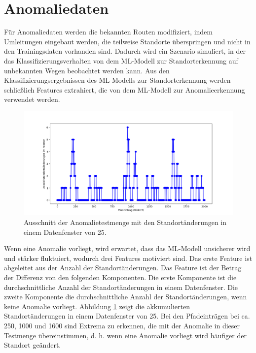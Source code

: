 \section{Anomaliedaten}
\label{sec:data_anomalie}
Für Anomaliedaten werden die bekannten Routen modifiziert, indem Umleitungen eingebaut werden, die teilweise Standorte überspringen
und nicht in den Trainingsdaten vorhanden sind.
Dadurch wird ein Szenario simuliert, in der das Klassifizierungsverhalten von dem ML-Modell zur Standorterkennung auf unbekannten Wegen beobachtet werden kann.
Aus den Klassifizierungsergebnissen des ML-Modells zur Standorterkennung werden schließlich Features extrahiert,
die von dem ML-Modell zur Anomalieerkennung verwendet werden.
\begin{figure}[h!]
    \centering
    \includegraphics[width=\linewidth]{images/feature_window_location_changes.png}
    \caption{Ausschnitt der Anomalietestmenge mit den Standortänderungen in einem Datenfenster von 25.}
    \label{fig:window_location_changes}
\end{figure}
\newline
\newline
Wenn eine Anomalie vorliegt, wird erwartet, dass das ML-Modell unsicherer wird und stärker fluktuiert,
wodurch drei Features motiviert sind.
Das erste Feature ist abgeleitet aus der Anzahl der Standortänderungen.
Das Feature ist der Betrag der Differenz von den folgenden Komponenten.
Die erste Komponente ist die durchschnittliche Anzahl der Standortänderungen in einem Datenfenster.
Die zweite Komponente die durchschnittliche Anzahl der Standortänderungen, wenn keine Anomalie vorliegt.
Abbildung \ref{fig:window_location_changes} zeigt die akkumulierten Standortänderungen in einem Datenfenster von 25.
Bei den Pfadeinträgen bei ca. 250, 1000 und 1600 sind Extrema zu erkennen, die mit der Anomalie in dieser Testmenge übereinstimmen,
d. h. wenn eine Anomalie vorliegt wird häufiger der Standort geändert.
